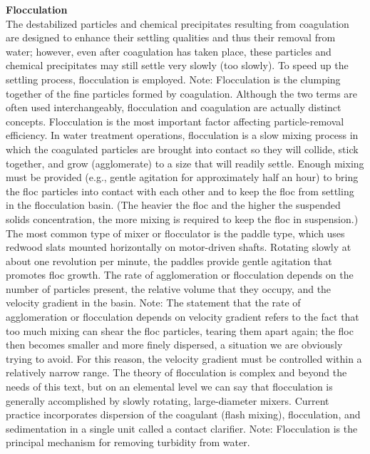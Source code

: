 \documentclass{article}
\begin{document}
\textbf{Flocculation}\\
The destabilized particles and chemical precipitates resulting from coagulation are designed to enhance their settling qualities and thus their removal from water; however, even after coagulation has taken place, these particles and chemical precipitates may still settle very slowly (too slowly). To speed up the settling process, flocculation is employed.
Note: Flocculation is the clumping together of the fine particles formed by coagulation. Although the two terms are often used interchangeably, flocculation and coagulation are actually distinct concepts.
Flocculation is the most important factor affecting particle-removal efficiency. In water treatment operations, flocculation is a slow mixing process in which the coagulated particles are brought into contact so they will collide, stick together, and grow (agglomerate) to a size that will readily settle. Enough mixing must be provided (e.g., gentle agitation for approximately half an hour) to bring the floc particles into contact with each other and to keep the floc from settling in the flocculation basin. (The heavier the floc and the higher the suspended solids concentration, the more mixing is required to keep the floc in suspension.) The most common type of mixer or flocculator is the paddle type, which uses redwood slats mounted horizontally on motor-driven shafts. Rotating slowly at about one revolution per minute, the paddles provide gentle agitation that promotes floc growth. The rate of agglomeration or flocculation depends on the number of particles present, the relative volume that they occupy, and the velocity gradient in the basin.  Note: The statement that the rate of agglomeration or flocculation depends on velocity gradient refers to the fact that too much mixing can shear the floc particles, tearing them apart again; the floc then becomes smaller and more finely dispersed, a situation we are obviously trying to avoid. For this reason, the velocity gradient must be controlled within a relatively narrow range.
The theory of flocculation is complex and beyond the needs of this text, but on an elemental level we can say that flocculation is generally accomplished by slowly rotating, large-diameter mixers. Current practice incorporates dispersion of the coagulant (flash mixing), flocculation, and sedimentation in a single unit called a contact clarifier.
Note: Flocculation is the principal mechanism for removing turbidity from water.
\end{document}

